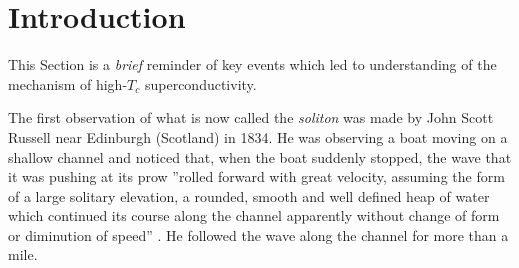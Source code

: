 



\draft
{}

\section{Introduction}

This Section is a {\em brief} reminder of key events which led
to understanding of the mechanism of high-$T_{c}$ superconductivity.

The first observation of what is now called the {\em soliton} was made
by John Scott Russell near Edinburgh (Scotland) in 1834. He was observing 
a boat moving on a shallow channel and noticed that, when the boat suddenly 
stopped, the wave that it was pushing at its prow ''rolled forward with 
great velocity, assuming the form of a large solitary elevation, a rounded, 
smooth and well defined heap of water which continued its course along 
the channel apparently without change of form or diminution of speed'' 
\cite{Russel}. He followed the wave along the channel for more than a 
mile.


